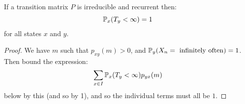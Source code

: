 \documentclass[../Main.tex]{subfiles}
\begin{document}
\begin{proposition}
    If a transition matrix $P$ is irreducible and recurrent then:
    \begin{equation*}
        \P_x(T_y < \infty) = 1
    \end{equation*}
    for all states $x$ and $y$.
    \label{propFiniteHittingTimes}
\end{proposition}
\begin{proof}
    We have $m$ such that $p_{xy}(m) > 0$, and $\P_y(X_n = \text{ infinitely often}) = 1$. Then bound the expression:
    \begin{equation*}
        \sum_{x \in I} \P_x(T_y < \infty)p_{yx}(m)
    \end{equation*}
    below by this (and so by 1), and so the individual terms must all be $1$.
\end{proof}
\end{document}
